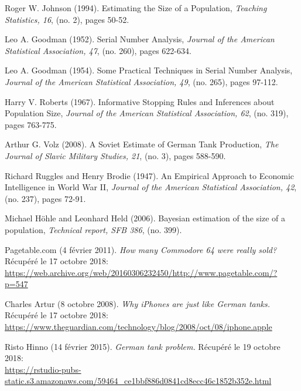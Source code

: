 \bigskip


\begin{thebibliography}{10}

 Roger W. Johnson (1994). Estimating the Size of a Population, {\em Teaching Statistics, 16}, (no. 2), pages 50-52.

 Leo A. Goodman (1952). Serial Number Analysis, {\em Journal of the American Statistical Association, 47}, (no. 260), pages 622-634.

 Leo A. Goodman (1954). Some Practical Techniques in Serial Number Analysis, {\em Journal of the American Statistical Association, 49}, (no. 265), pages 97-112.

 Harry V. Roberts (1967). Informative Stopping Rules and Inferences about Population Size, {\em Journal of the American Statistical Association, 62}, (no. 319), pages 763-775.

 Arthur G. Volz (2008). A Soviet Estimate of German Tank Production, {\em The Journal of Slavic Military Studies, 21}, (no. 3), pages 588-590.

 Richard Ruggles and Henry Brodie (1947). An Empirical Approach to Economic Intelligence in World War II, {\em Journal of the American Statistical Association, 42}, (no. 237), pages 72-91.

 Michael Höhle and Leonhard Held (2006). Bayesian estimation of the size of a population, {\em Technical report, SFB 386}, (no. 399).

 Pagetable.com (4 février 2011). {\em How many Commodore 64 were really sold?} Récupéré le 17 octobre 2018:\\  \href{https://web.archive.org/web/20160306232450/http://www.pagetable.com/?p=547}{https://web.archive.org/web/20160306232450/http://www.pagetable.com/?p=547}

 Charles Artur (8 octobre 2008). {\em Why iPhones are just like German tanks.} Récupéré le 17 octobre 2018:\\ \href{https://www.theguardian.com/technology/blog/2008/oct/08/iphone.apple}{https://www.theguardian.com/technology/blog/2008/oct/08/iphone.apple}

 Risto Hinno (14 février 2015). {\em German tank problem.} Récupéré le 19 octobre 2018:\\  \href{https://rstudio-pubs-static.s3.amazonaws.com/59464\_ce1bbf886d0841cd8ecc46c1852b352e.html}{https://rstudio-pubs-static.s3.amazonaws.com/59464\_ce1bbf886d0841cd8ecc46c1852b352e.html}


\end{thebibliography}
